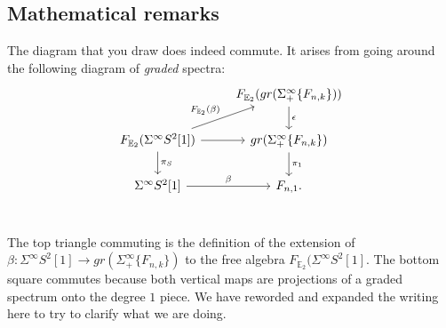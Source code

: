 \documentclass[reqno, oneside]{amsart}
\theoremstyle{definition}
\theoremstyle{plain}
\DeclareMathOperator{\E}{\mathbb{E}}
\begin{document}
\subsection{Mathematical remarks}






The diagram that you draw does indeed commute.  It arises from going around the following diagram of \emph{graded} spectra:
$$
\begin{tikzcd}
 & F_{\E_2}( gr(\Sigma^{\infty}_+\{F_{n,k}\}) )\arrow[d,"\epsilon"] \\
F_{\E_2}(\Sigma^{\infty}S^2[1]) \arrow[ru, "F_{\E_2}(\beta)"] \arrow[r]\arrow[d,"\pi_S"] & gr(\Sigma^{\infty}_+ \{ F_{n,k}\} ) \arrow[d,"\pi_1"] \\
\Sigma^{\infty} S^2[1] \arrow[r,"\beta"]& F_{n,1}.\\
\end{tikzcd}
$$

The top triangle commuting is the definition of the extension of $\beta: \Sigma^{\infty}S^2[1] \to gr(\Sigma^{\infty}_+ \{F_{n,k} \} )$ to the free algebra $F_{\E_2} (\Sigma^{\infty} S^2[1]$.  The bottom square commutes because both vertical maps are projections of a graded spectrum onto the degree $1$ piece.  We have reworded and expanded the writing here to try to clarify what we are doing.  
\end{document}
